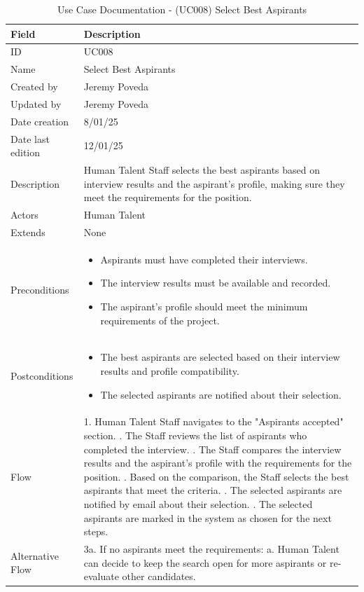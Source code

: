 \documentclass{scrreprt}
\begin{document}
\begin{table}[H]
	\centering
	\begin{tabular}{|p{3cm}|p{10cm}|}
		\hline
		\textbf{Field} & \textbf{Description} \\ \hline
		ID & UC008 \\ \hline
		Name & Select Best Aspirants \\ \hline
		Created by & Jeremy Poveda \\ \hline
		Updated by & Jeremy Poveda \\ \hline
		Date creation & 8/01/25 \\ \hline
		Date last edition & 12/01/25 \\ \hline
		Description & Human Talent Staff selects the best aspirants based on interview results and the aspirant’s profile, making sure they meet the requirements for the position. \\ \hline
		Actors & Human Talent \\ \hline
		Extends & None \\ \hline
		Preconditions & 
		\begin{itemize}
			\item Aspirants must have completed their interviews.
			\item The interview results must be available and recorded.
			\item The aspirant’s profile should meet the minimum requirements of the project.
		\end{itemize} \\ \hline
		Postconditions & 
		\begin{itemize}
			\item The best aspirants are selected based on their interview results and profile compatibility.
			\item The selected aspirants are notified about their selection.
		\end{itemize} \\ \hline
		Flow & 
		1. Human Talent Staff navigates to the "Aspirants accepted" section. \newline
		2. The Staff reviews the list of aspirants who completed the interview. \newline
		3. The Staff compares the interview results and the aspirant’s profile with the requirements for the position. \newline
		4. Based on the comparison, the Staff selects the best aspirants that meet the criteria. \newline
		5. The selected aspirants are notified by email about their selection. \newline
		6. The selected aspirants are marked in the system as chosen for the next steps. \\ \hline
		Alternative Flow & 
		3a. If no aspirants meet the requirements: \newline
		\hspace*{0.5cm} a. Human Talent can decide to keep the search open for more aspirants or re-evaluate other candidates. \\ \hline
	\end{tabular}
	\caption{Use Case Documentation - (UC008) Select Best Aspirants}
	\label{table:UC008}
\end{table}
\end{document}
